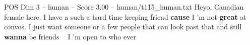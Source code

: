 \begin{textsample}{POS Dim 3 – human – Score 3.00 – human/t115\_human.txt}  \label{ex:f3_pos_019}
Heyo, Canadian female here.
I have a such a hard time keeping friend \textbf{cause} I ’m not \textbf{great} at convos.
I just want someone or a few people that can look past that and still \textbf{wanna} be friends {\EmojiFont 🫶}🏻 I ’m open to who ever

\end{textsample}
